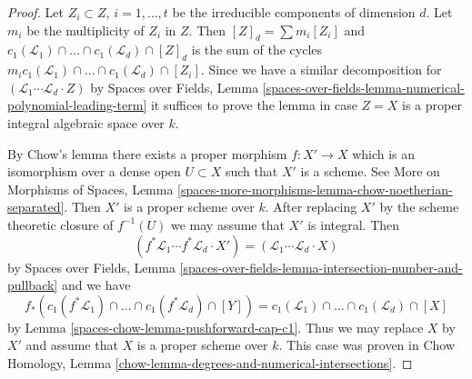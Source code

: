 \begin{proof}
Let $Z_i \subset Z$, $i = 1, \ldots, t$ be the irreducible components
of dimension $d$. Let $m_i$ be the multiplicity of $Z_i$ in $Z$. Then
$[Z]_d = \sum m_i[Z_i]$ and
$c_1(\mathcal{L}_1) \cap \ldots \cap c_1(\mathcal{L}_d) \cap [Z]_d$
is the sum of the cycles
$m_i c_1(\mathcal{L}_1) \cap \ldots \cap c_1(\mathcal{L}_d) \cap [Z_i]$.
Since we have a similar decomposition for
$(\mathcal{L}_1 \cdots \mathcal{L}_d \cdot Z)$ by
Spaces over Fields, Lemma
\ref{spaces-over-fields-lemma-numerical-polynomial-leading-term}
it suffices to prove the lemma in case $Z = X$
is a proper integral algebraic space over $k$.

\medskip\noindent
By Chow's lemma there exists a proper morphism $f : X' \to X$
which is an isomorphism over a dense open $U \subset X$
such that $X'$ is a scheme. See More on Morphisms of Spaces, Lemma
\ref{spaces-more-morphisms-lemma-chow-noetherian-separated}.
Then $X'$ is a proper scheme over $k$. After replacing $X'$
by the scheme theoretic closure of $f^{-1}(U)$
we may assume that $X'$ is integral. Then
$$
(f^*\mathcal{L}_1 \cdots f^*\mathcal{L}_d \cdot X') =
(\mathcal{L}_1 \cdots \mathcal{L}_d \cdot X)
$$
by Spaces over Fields, Lemma
\ref{spaces-over-fields-lemma-intersection-number-and-pullback}
and we have
$$
f_*(c_1(f^*\mathcal{L}_1) \cap \ldots \cap c_1(f^*\mathcal{L}_d) \cap [Y]) =
c_1(\mathcal{L}_1) \cap \ldots \cap c_1(\mathcal{L}_d) \cap [X]
$$
by Lemma \ref{spaces-chow-lemma-pushforward-cap-c1}. Thus we may replace $X$ by $X'$
and assume that $X$ is a proper scheme over $k$. This case
was proven in Chow Homology, Lemma
\ref{chow-lemma-degrees-and-numerical-intersections}.
\end{proof}



